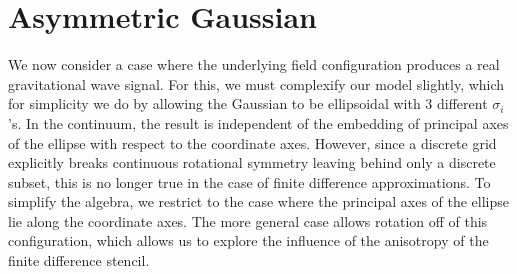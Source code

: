 \documentclass{revtex4}
\begin{document}
\section{Asymmetric Gaussian}
We now consider a case where the underlying field configuration produces a real gravitational wave signal.
For this, we must complexify our model slightly, which for simplicity we do by allowing the Gaussian to be ellipsoidal with 3 different $\sigma_i$'s.
In the continuum, the result is independent of the embedding of principal axes of the ellipse with respect to the coordinate axes.
However, since a discrete grid explicitly breaks continuous rotational symmetry leaving behind only a discrete subset, this is no longer true in the case of finite difference approximations.
To simplify the algebra, we restrict to the case where the principal axes of the ellipse lie along the coordinate axes.
The more general case allows rotation off of this configuration, which allows us to explore the influence of the anisotropy of the finite difference stencil.
\end{document}
